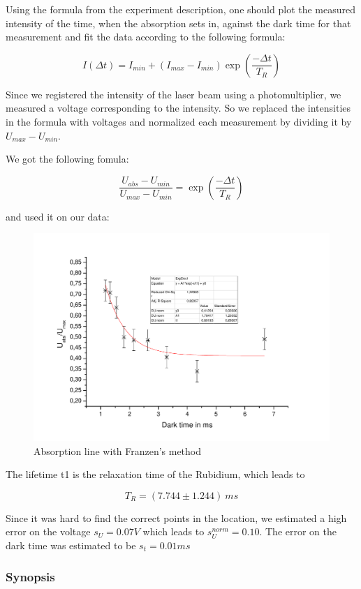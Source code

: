 Using the formula from the experiment description, one should plot the measured intensity of the time, when the absorption sets in, against the dark time for that measurement and fit the data according to the following formula:

$$I(\Delta t) = I_{min} + (I_{max} - I_{min})\exp\left(\frac{-\Delta t}{T_R}\right) $$

Since we registered the intensity of the laser beam using a photomultiplier, we measured a voltage corresponding to the intensity. So we replaced the intensities in the formula with voltages and normalized each measurement by dividing it by $U_{max} - U_{min}$.

We got the following fomula:

$$ \frac{U_{abs} - U_{min}}{U_{max}-U_{min}} = \exp\left(\frac{-\Delta t}{T_R}\right) $$

and used it on our data:

\begin{figure}[H]
\centering \includegraphics[width=1.1\textwidth]{BilderAusw/Franzen.pdf}
\caption{Absorption line with Franzen's method}
\end{figure}

The lifetime t1 is the relaxation time of the Rubidium, which leads to

$$\boxed{T_R = (7.744 \pm 1.244)\ ms}$$

Since it was hard to find the correct points in the location, we estimated a high error on the voltage $s_U = 0.07 V$ which leads to $s_U^{norm} = 0.10$. The error on the dark time was estimated to be $s_t = 0.01 ms$

\subsubsection{Synopsis}


